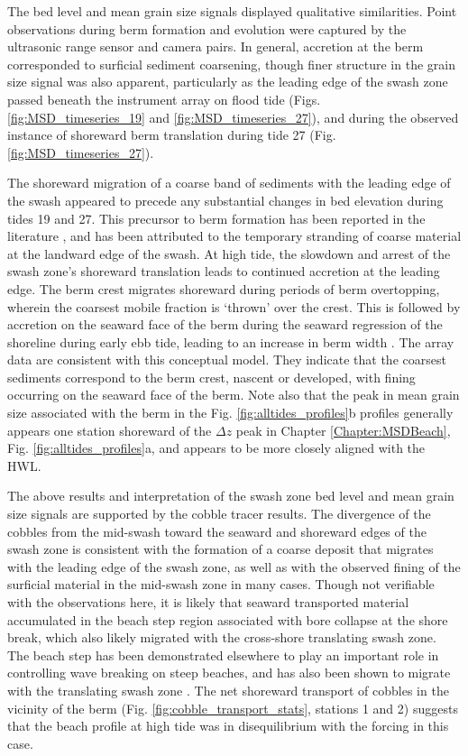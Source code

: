 The bed level and mean grain size signals displayed qualitative similarities. Point observations during berm formation and evolution were captured by the ultrasonic range sensor and camera pairs. In general, accretion at the berm corresponded to surficial sediment coarsening, though finer structure in the grain size signal was also apparent, particularly as the leading edge of the swash zone passed beneath the instrument array on flood tide (Figs. \ref{fig:MSD_timeseries_19} and \ref{fig:MSD_timeseries_27}), and during the observed instance of shoreward berm translation during tide 27 (Fig. \ref{fig:MSD_timeseries_27}). 

The shoreward migration of a coarse band of sediments with the leading edge of the swash appeared to precede any substantial changes in bed elevation during tides 19 and 27. This precursor to berm formation has been reported in the literature \citep[e.g.,][]{Austin_Buscombe2008, Duncan1964}, and has been attributed to the temporary stranding of coarse material at the landward edge of the swash. At high tide, the slowdown and arrest of the swash zone's shoreward translation leads to continued accretion at the leading edge. The berm crest migrates shoreward during periods of berm overtopping, wherein the coarsest mobile fraction is `thrown' over the crest. This is followed by accretion on the seaward face of the berm during the seaward regression of the shoreline during early ebb tide, leading to an increase in berm width \citep[e.g.,][]{Pontee_etal2004, Austin_Masselink2006}. The array data are consistent with this conceptual model. They indicate that the coarsest sediments correspond to the berm crest, nascent or developed, with fining occurring on the seaward face of the berm. Note also that the peak in mean grain size associated with the berm in the Fig. \ref{fig:alltides_profiles}b profiles generally appears one station shoreward of the $\Delta z$ peak in Chapter \ref{Chapter:MSDBeach}, Fig. \ref{fig:alltides_profiles}a, and appears to be more closely aligned with the HWL.

The above results and interpretation of the swash zone bed level and mean grain size signals are supported by the cobble tracer results. The divergence of the cobbles from the mid-swash toward the seaward and shoreward edges of the swash zone is consistent with the formation of a coarse deposit that migrates with the leading edge of the swash zone, as well as with the observed fining of the surficial material in the mid-swash zone in many cases. Though not verifiable with the observations here, it is likely that seaward transported material accumulated in the beach step region associated with bore collapse at the shore break, which also likely migrated with the cross-shore translating swash zone. The beach step has been demonstrated elsewhere to play an important role in controlling wave breaking on steep beaches, and has also been shown to migrate with the translating swash zone \citep{Austin_Buscombe2008}. The net shoreward transport of cobbles in the vicinity of the berm (Fig. \ref{fig:cobble_transport_stats}, stations 1 and 2) suggests that the beach profile at high tide was in disequilibrium with the forcing in this case.


